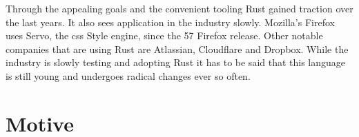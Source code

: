 \documentclass[thesis]{subfiles}
\begin{document}
    Through the appealing goals and the convenient tooling Rust gained traction over the last years.\autocites{sosurvey}{rustorg}{rust3}
    It also sees application in the industry slowly.
    Mozilla's Firefox uses Servo, the \gls{css} Style engine, since the 57 Firefox release.\autocite{servo}
    Other notable companies that are using Rust are Atlassian, Cloudflare
    and Dropbox.\autocite{rustorg}
    While the industry is slowly testing and adopting Rust it has to be said that this language is still young and undergoes radical changes ever so often.

\section{Motive}
\end{document}
